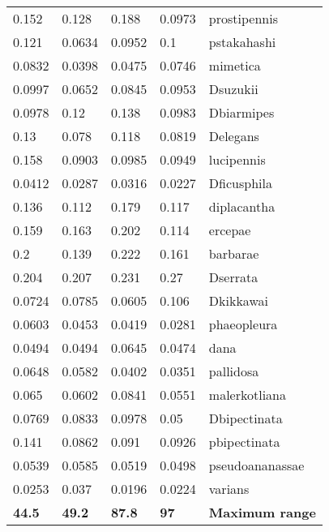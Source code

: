 \begin{tabular}{lllll}
          0.152 &           0.128 &           0.188 &        0.0973 &            prostipennis \\
          0.121 &          0.0634 &          0.0952 &           0.1 &             pstakahashi \\
         0.0832 &          0.0398 &          0.0475 &        0.0746 &                mimetica \\
         0.0997 &          0.0652 &          0.0845 &        0.0953 &                Dsuzukii \\
         0.0978 &            0.12 &           0.138 &        0.0983 &              Dbiarmipes \\
           0.13 &           0.078 &           0.118 &        0.0819 &                Delegans \\
          0.158 &          0.0903 &          0.0985 &        0.0949 &              lucipennis \\
         0.0412 &          0.0287 &          0.0316 &        0.0227 &             Dficusphila \\
          0.136 &           0.112 &           0.179 &         0.117 &             diplacantha \\
          0.159 &           0.163 &           0.202 &         0.114 &                 ercepae \\
            0.2 &           0.139 &           0.222 &         0.161 &                barbarae \\
          0.204 &           0.207 &           0.231 &          0.27 &                Dserrata \\
         0.0724 &          0.0785 &          0.0605 &         0.106 &               Dkikkawai \\
         0.0603 &          0.0453 &          0.0419 &        0.0281 &             phaeopleura \\
         0.0494 &          0.0494 &          0.0645 &        0.0474 &                    dana \\
         0.0648 &          0.0582 &          0.0402 &        0.0351 &               pallidosa \\
          0.065 &          0.0602 &          0.0841 &        0.0551 &           malerkotliana \\
         0.0769 &          0.0833 &          0.0978 &          0.05 &            Dbipectinata \\
          0.141 &          0.0862 &           0.091 &        0.0926 &            pbipectinata \\
         0.0539 &          0.0585 &          0.0519 &        0.0498 &         pseudoananassae \\
         0.0253 &           0.037 &          0.0196 &        0.0224 &                 varians \\
 \textbf{ 44.5} &  \textbf{ 49.2} &  \textbf{ 87.8} &  \textbf{ 97} &  \textbf{Maximum range} \\
\bottomrule
\end{tabular}
